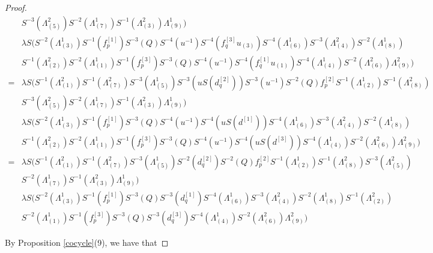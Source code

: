 \documentclass[12pt]{amsart}
\begin{document}
\begin{proof}
\[\begin{aligned}
	&S^{-3}(\Lambda^2_{(5)})S^{-2}(\Lambda^1_{(7)})S^{-1}(\Lambda^2_{(3)})\Lambda^1_{(9)})\\
	&\lambda S(S^{-2}(\Lambda^1_{(3)})S^{-1}(f^{[1]}_p)S^{-3}(Q)S^{-4}(u^{-1})S^{-4}(f^{[3]}_qu_{(3)})S^{-4}(\Lambda^{1}_{(6)})S^{-3}(\Lambda^2_{(4)})S^{-2}(\Lambda^1_{(8)})\\
	&S^{-1}(\Lambda^2_{(2)})S^{-2}(\Lambda^1_{(1)})S^{-1}(f^{[3]}_p)S^{-3}(Q)S^{-4}(u^{-1})S^{-4}(f^{[1]}_qu_{(1)})S^{-4}(\Lambda^1_{(4)})S^{-2}(\Lambda^2_{(6)})\Lambda^2_{(9)})\\
	=&\lambda S (S^{-1}(\Lambda^2_{(1)})S^{-1}(\Lambda^2_{(7)})S^{-3}(\Lambda^1_{(5)})S^{-3}(uS(d^{[2]}_q))S^{-3}(u^{-1})S^{-2}(Q)f^{[2]}_pS^{-1}(\Lambda^1_{(2)})S^{-1}(\Lambda^2_{(8)})\\
	&S^{-3}(\Lambda^2_{(5)})S^{-2}(\Lambda^1_{(7)})S^{-1}(\Lambda^2_{(3)})\Lambda^1_{(9)})\\
	&\lambda S(S^{-2}(\Lambda^1_{(3)})S^{-1}(f^{[1]}_p)S^{-3}(Q)S^{-4}(u^{-1})S^{-4}(uS(d^{[1]}))S^{-4}(\Lambda^{1}_{(6)})S^{-3}(\Lambda^2_{(4)})S^{-2}(\Lambda^1_{(8)})\\
	&S^{-1}(\Lambda^2_{(2)})S^{-2}(\Lambda^1_{(1)})S^{-1}(f^{[3]}_p)S^{-3}(Q)S^{-4}(u^{-1})S^{-4}(uS(d^{[3]}))S^{-4}(\Lambda^1_{(4)})S^{-2}(\Lambda^2_{(6)})\Lambda^2_{(9)})\\
	=&\lambda S (S^{-1}(\Lambda^2_{(1)})S^{-1}(\Lambda^2_{(7)})S^{-3}(\Lambda^1_{(5)})S^{-2}(d^{[2]}_q)S^{-2}(Q)f^{[2]}_pS^{-1}(\Lambda^1_{(2)})S^{-1}(\Lambda^2_{(8)})S^{-3}(\Lambda^2_{(5)})\\
	&S^{-2}(\Lambda^1_{(7)})S^{-1}(\Lambda^2_{(3)})\Lambda^1_{(9)})\\
	&\lambda S(S^{-2}(\Lambda^1_{(3)})S^{-1}(f^{[1]}_p)S^{-3}(Q)S^{-3}(d^{[1]}_q)S^{-4}(\Lambda^{1}_{(6)})S^{-3}(\Lambda^2_{(4)})S^{-2}(\Lambda^1_{(8)})S^{-1}(\Lambda^2_{(2)})\\
	&S^{-2}(\Lambda^1_{(1)})S^{-1}(f^{[3]}_p)S^{-3}(Q)S^{-3}(d^{[3]}_q)S^{-4}(\Lambda^1_{(4)})S^{-2}(\Lambda^2_{(6)})\Lambda^2_{(9)})
\end{aligned}
\]

 By Proposition \ref{cocycle}(9), we have that


\end{proof}
\end{document}
